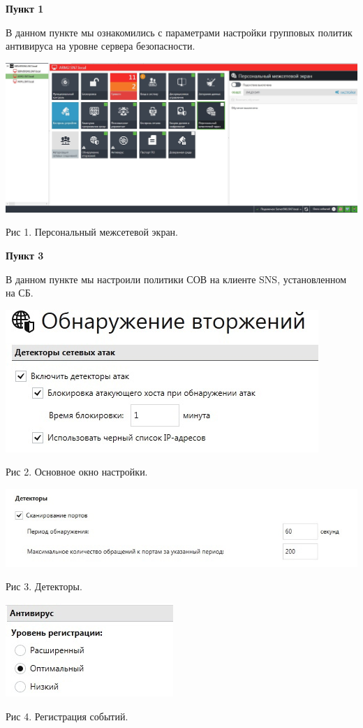 \documentclass[a4paper,14pt]{extarticle}
\begin{document}
    \textbf{Пункт 1}
    \vspace{-3ex}
    \begin{center}
        \singlespacing
        В данном пункте мы ознакомились с параметрами настройки групповых политик антивируса на
уровне сервера безопасности. 

        \includegraphics[scale=0.3]{pics/1.jpg}

      Рис 1. Персональный межсетевой экран.
    \end{center}

    \textbf{Пункт 3}
    \vspace{-3ex}
    \begin{center}
        \singlespacing
        В данном пункте мы настроили политики СОВ на клиенте SNS, установленном на СБ.

        \includegraphics[scale=0.8]{pics/3_1.jpg}

        Рис 2. Основное окно настройки.

        \includegraphics[scale=0.65]{pics/3_2.jpg}

        Рис 3. Детекторы.

        \includegraphics[scale=0.8]{pics/3_3.jpg}
 
        Рис 4. Регистрация событий.
    \end{center}
\end{document}
